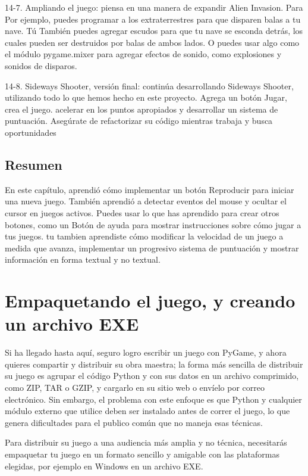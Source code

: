 14-7. Ampliando el juego: piensa en una manera de expandir Alien Invasion. Para
Por ejemplo, puedes programar a los extraterrestres para que disparen balas a tu nave. Tú
También puedes agregar escudos para que tu nave se esconda detrás, los cuales pueden ser destruidos por
balas de ambos lados. O puedes usar algo como el módulo pygame.mixer
para agregar efectos de sonido, como explosiones y sonidos de disparos.


14-8. Sideways Shooter, versión final: continúa desarrollando Sideways Shooter,
utilizando todo lo que hemos hecho en este proyecto. Agrega un botón Jugar, crea el juego.
acelerar en los puntos apropiados y desarrollar un sistema de puntuación. Asegúrate de refactorizar
su código mientras trabaja y busca oportunidades

\section{Resumen}

En este capítulo, aprendió cómo implementar un botón Reproducir para iniciar una nueva
juego. También aprendió a detectar eventos del mouse y ocultar el cursor en
juegos activos. Puedes usar lo que has aprendido para crear otros botones, como un
Botón de ayuda para mostrar instrucciones sobre cómo jugar a tus juegos. tu tambien aprendiste
cómo modificar la velocidad de un juego a medida que avanza, implementar un progresivo
sistema de puntuación y mostrar información en forma textual y no textual.

\chapter{Empaquetando el juego, y creando un archivo EXE}              %


Si ha llegado hasta aquí, seguro logro escribir un juego con PyGame, y ahora quieres compartir y distribuir su obra maestra; la forma más sencilla de distribuir su juego es agrupar el código Python y con sus datos en un
archivo comprimido, como {\ttfamily ZIP},  {\ttfamily TAR} o  {\ttfamily GZIP}, y cargarlo en su sitio web o envíelo por correo electrónico. 
Sin embargo, el problema con este enfoque es que Python y cualquier módulo externo que utilice deben ser instalado antes de correr el juego, lo que genera dificultades para el publico común que no maneja esas técnicas.

Para distribuir su juego a una audiencia más amplia y no técnica, necesitarás empaquetar tu juego en un formato
sencillo y amigable  con  las plataformas elegidas, por ejemplo en Windows en un archivo  {\ttfamily EXE}.

